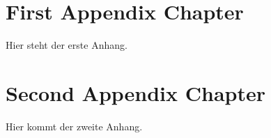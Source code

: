 \begin{appendix}


\chapter{First Appendix Chapter}

Hier steht der erste Anhang.


\chapter{Second Appendix Chapter}

Hier kommt der zweite Anhang.


\end{appendix}
